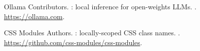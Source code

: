 \documentclass[UTF8, a4paper, 10.5pt, twocolumn, fontset=none]{ctexart}
\begin{document}
\begin{thebibliography}{18}
{Ollama Contributors}.
: local inference for open-weights {LLMs}\allowbreak[EB/OL].
\allowbreak[2026-06-20].
\newblock \url{https://ollama.com}.

{CSS Modules Authors}.
: locally-scoped {CSS} class names\allowbreak[EB/OL].
\allowbreak[2026-06-20].
\newblock \url{https://github.com/css-modules/css-modules}.

\end{thebibliography}
\endgroup
\end{document}
